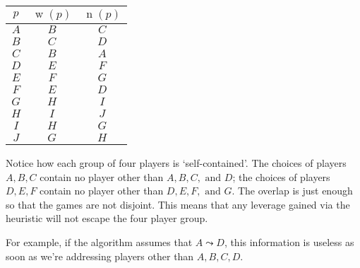 \documentclass[12pt]{article}
\DeclareMathOperator{\w}{w}
\DeclareMathOperator{\n}{n}
\begin{document}
    \begin{center}
        \begin{tabular}{c | c | c}
            $p$ & $\w(p)$ & $\n(p)$\\
            \hline
            $A$ & $B$ & $C$\\
            $B$ & $C$ & $D$\\
            $C$ & $B$ & $A$\\
            \hline
            $D$ & $E$ & $F$\\
            $E$ & $F$ & $G$\\
            $F$ & $E$ & $D$\\
            \hline
            $G$ & $H$ & $I$\\
            $H$ & $I$ & $J$\\
            $I$ & $H$ & $G$\\
            $J$ & $G$ & $H$
        \end{tabular}
    \end{center}

    Notice how each group of four players is `self-contained'. The choices of players $A,B,C$ contain no player other than $A,B,C, \text{ and } D$; the choices of players $D, E, F$ contain no player other than $D, E, F, \text{ and } G$. The overlap is just enough so that the games are not disjoint. This means that any leverage gained via the heuristic will not escape the four player group.

    For example, if the algorithm assumes that $A \leadsto D$, this information is useless as soon as we're addressing players other than $A,B,C,D$.
\end{document}
